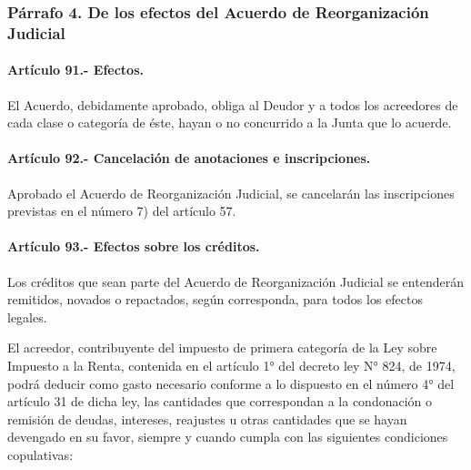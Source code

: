 \documentclass[
]{book}
\begin{document}
\hypertarget{puxe1rrafo-4.-de-los-efectos-del-acuerdo-de-reorganizaciuxf3n-judicial}{%
\subsubsection*{Párrafo 4. De los efectos del Acuerdo de Reorganización Judicial}\label{puxe1rrafo-4.-de-los-efectos-del-acuerdo-de-reorganizaciuxf3n-judicial}}

\hypertarget{artuxedculo-91.--efectos.}{%
\paragraph*{Artículo 91.- Efectos.}\label{artuxedculo-91.--efectos.}}

El Acuerdo, debidamente aprobado, obliga al Deudor y a todos los acreedores de cada clase o categoría de éste, hayan o no concurrido a la Junta que lo acuerde.

\hypertarget{artuxedculo-92.--cancelaciuxf3n-de-anotaciones-e-inscripciones.}{%
\paragraph*{Artículo 92.- Cancelación de anotaciones e inscripciones.}\label{artuxedculo-92.--cancelaciuxf3n-de-anotaciones-e-inscripciones.}}

Aprobado el Acuerdo de Reorganización Judicial, se cancelarán las inscripciones previstas en el número 7) del artículo 57.

\hypertarget{artuxedculo-93.--efectos-sobre-los-cruxe9ditos.}{%
\paragraph*{Artículo 93.- Efectos sobre los créditos.}\label{artuxedculo-93.--efectos-sobre-los-cruxe9ditos.}}

Los créditos que sean parte del Acuerdo de Reorganización Judicial se entenderán remitidos, novados o repactados, según corresponda, para todos los efectos legales.

El acreedor, contribuyente del impuesto de primera categoría de la Ley sobre Impuesto a la Renta, contenida en el artículo 1° del decreto ley N° 824, de 1974, podrá deducir como gasto necesario conforme a lo dispuesto en el número 4° del artículo 31 de dicha ley, las cantidades que correspondan a la condonación o remisión de deudas, intereses, reajustes u otras cantidades que se hayan devengado en su favor, siempre y cuando cumpla con las siguientes condiciones copulativas:
\end{document}
